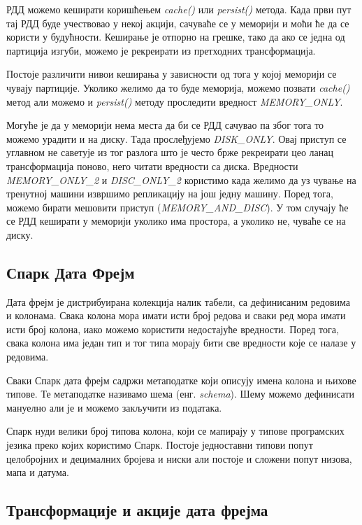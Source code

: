\documentclass[12pt,oneside]{memoir}
\begin{document}
РДД можемо кеширати коришћењем \textit{cache()} или \textit{persist()} метода. Када први пут тај РДД буде учествовао у некој акцији, сачуваће се у меморији и моћи ће да се користи у будућности. Кеширање је отпорно на грешке, тако да ако се једна од партиција изгуби, можемо је рекреирати из претходних трансформација. \cite{spark_rdd}

Постоје различити нивои кеширања у зависности од тога у којој меморији се чувају партиције. Уколико желимо да то буде меморија, можемо позвати \textit{cache()} метод али можемо и \textit{persist()} методу проследити вредност \textit{MEMORY\_ONLY}. 

Могуће је да у меморији нема места да би се РДД сачувао па због тога то можемо урадити и на диску. Тада прослеђујемо \textit{DISK\_ONLY}. Овај приступ се углавном не саветује из тог разлога што је често брже рекреирати цео ланац трансформација поново, него читати вредности са диска. Вредности \textit{MEMORY\_ONLY\_2} и \textit{DISC\_ONLY\_2} користимо када желимо да уз чување на тренутној машини извршимо репликацију на још једну машину. Поред тога, можемо бирати мешовити приступ (\textit{MEMORY\_AND\_DISC}). У том случају ће се РДД кеширати у меморији уколико има простора, а уколико не, чуваће се на диску. \cite{spark_rdd}

\subsection{Спарк Дата Фрејм}
\label{subsec:spark_df}

Дата фрејм је дистрибуирана колекција налик табели, са дефинисаним редовима и колонама. Свака колона мора имати исти број редова и сваки ред мора имати исти број колона, иако можемо користити недостајуће вредности. Поред тога, свака колона има један тип и тог типа морају бити све вредности које се налазе у редовима. \cite{spark_guide}

Сваки Спарк дата фрејм садржи метаподатке који описују имена колона и њихове типове. Те метаподатке називамо шема (енг. \textit{schema}). Шему можемо дефинисати мануелно али је и можемо закључити из података. \cite{spark_guide}

Спарк нуди велики број типова колона, који се мапирају у типове програмских језика преко којих користимо Спарк. Постоје једноставни типови попут целобројних и децималних бројева и ниски али постоје и сложени попут низова, мапа и датума. \cite{spark_guide}

\subsection{Трансформације и акције дата фрејма}
\label{subsec:spark_sql_ac_tr}
\end{document}
